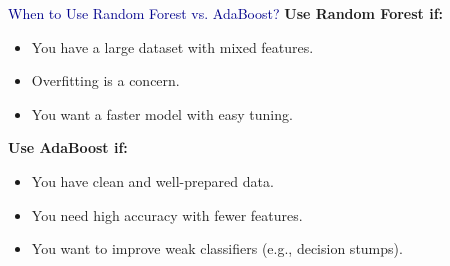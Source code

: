 \begin{frame}{\textcolor{darkblue}{When to Use Random Forest vs. AdaBoost?}}
    \textbf{Use Random Forest if:}
    \begin{itemize}
        \item You have a large dataset with mixed features.
        \item Overfitting is a concern.
        \item You want a faster model with easy tuning.
    \end{itemize}

    \vspace{0.3cm}
    \textbf{Use AdaBoost if:}
    \begin{itemize}
        \item You have clean and well-prepared data.
        \item You need high accuracy with fewer features.
        \item You want to improve weak classifiers (e.g., decision stumps).
    \end{itemize}
\end{frame}



